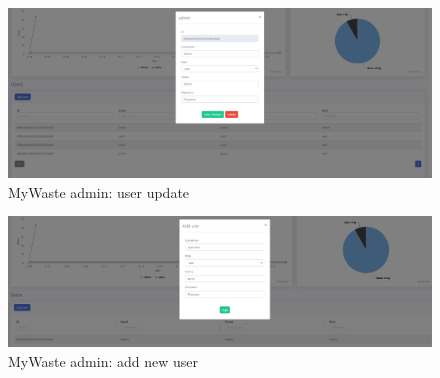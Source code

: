 \documentclass{report}
\begin{document}
\begin{figure}[h!]
    \begin{center}
        \includegraphics[width=1.0\textwidth]{images/updateUserData.PNG}  \end{center}
    \caption{MyWaste admin: user update}
    \label{fig: userUpdate}
\end{figure}
\begin{figure}[h!]
    \begin{center}
        \includegraphics[width=1.0\textwidth]{images/addNewUser.PNG}  \end{center}
    \caption{MyWaste admin: add new user}
    \label{fig: addNewUser}
\end{figure}


%
%
\end{document}
